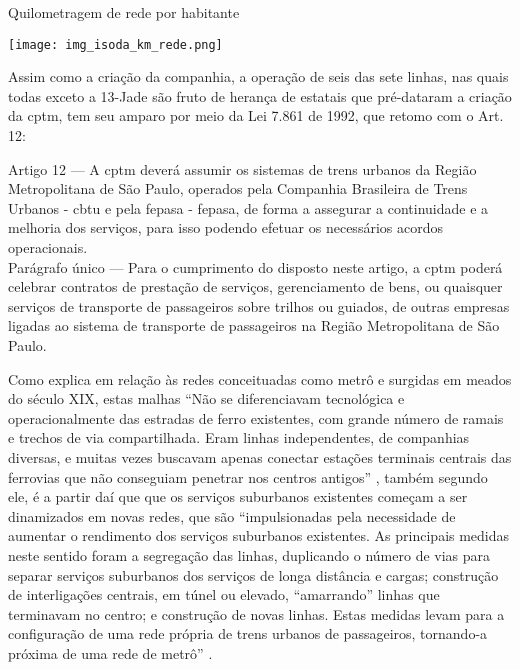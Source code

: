 \documentclass[11pt,fleqn]{book} %
\begin{document}
\begin{table}[h]
	\caption{Quilometragem de rede por habitante \cite[p. 58]{Isoda}}
	\texttt{[image: img\_isoda\_km\_rede.png]}
	\label{tab:isoda_km}
\end{table}

Assim como a criação da companhia, a operação de seis das sete linhas, nas quais todas exceto a 13-Jade são fruto de herança de estatais que pré-dataram a criação da {\glsdesc*{cptm}}, tem seu amparo por meio da Lei 7.861 de 1992, que retomo com o Art. 12:

\begin{citacao}
	Artigo 12 --- A \gls{cptm} deverá assumir os sistemas de trens urbanos da Região Metropolitana de São Paulo, operados pela Companhia Brasileira de Trens Urbanos - \gls{cbtu} e pela \glsdesc{fepasa} - \gls{fepasa}, de forma a assegurar a continuidade e a melhoria dos serviços, para isso podendo efetuar os necessários acordos operacionais.\\
	Parágrafo único --- Para o cumprimento do disposto neste artigo, a \gls{cptm} poderá celebrar contratos de prestação de serviços, gerenciamento de bens, ou quaisquer serviços de transporte de passageiros sobre trilhos ou guiados, de outras empresas ligadas ao sistema de transporte de passageiros na Região Metropolitana de São Paulo. \cite{lei7861}
\end{citacao}

Como explica \citeauthor{Isoda} em relação às redes conceituadas como metrô e surgidas em meados do século XIX, estas malhas ``Não se diferenciavam tecnológica e operacionalmente das estradas de ferro  existentes,  com  grande  número  de  ramais  e  trechos  de  via compartilhada. Eram linhas independentes, de companhias diversas, e muitas  vezes  buscavam  apenas  conectar  estações  terminais  centrais das ferrovias que não conseguiam penetrar nos centros antigos'' \cite[p. 30]{Isoda}, também segundo ele, é a partir daí que que os serviços suburbanos existentes começam a ser dinamizados em novas redes, que são ``impulsionadas  pela  necessidade  de  aumentar  o  rendimento  dos serviços  suburbanos  existentes.  As  principais  medidas  neste  sentido foram  a  segregação  das  linhas,  duplicando  o  número  de  vias  para separar serviços suburbanos dos serviços de longa distância e  cargas; construção  de  interligações  centrais,  em  túnel  ou  elevado, “amarrando” linhas que terminavam no centro; e construção de novas linhas. Estas medidas levam para a configuração de uma rede própria de trens urbanos de passageiros, tornando-a próxima de uma rede de metrô'' \cite[p. 32]{Isoda}.
\end{document}

